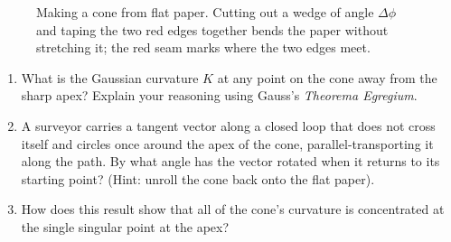 \begin{enumerate}
\begin{figure}[htbp]
\caption{Making a cone from flat paper. Cutting out a wedge of angle $\Delta\phi$ and taping the two red edges together bends the paper without stretching it; the red seam marks where the two edges meet.}\label{23:fig-cone}
\end{figure}
\begin{enumerate}
\item What is the Gaussian curvature $K$ at any point on the cone away from the sharp apex? Explain your reasoning using Gauss's \emph{Theorema Egregium}.
\item A surveyor carries a tangent vector along a closed loop that does not cross itself and circles once around the apex of the cone, parallel-transporting it along the path. By what angle has the vector rotated when it returns to its starting point? (Hint: unroll the cone back onto the flat paper).
\item How does this result show that all of the cone's curvature is concentrated at the single singular point at the apex?
\end{enumerate}
\end{enumerate}

\newpage
